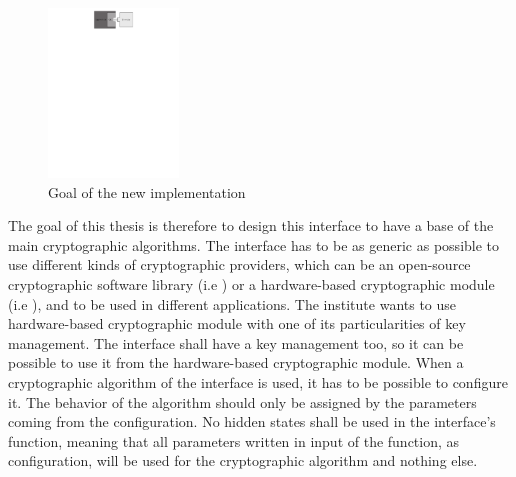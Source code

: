 \begin{figure}[!ht]
\centering
\includegraphics[trim=4.5cm 24.5cm 2cm 0cm, height=4.5cm]{figures/intro_gci.pdf}
\caption{Goal of the new implementation}
\label{fig:motiv_gci}
\end{figure}

The goal of this thesis is therefore to design this interface to have a
base of the main cryptographic algorithms. The interface has to be as
generic as possible to use different kinds of cryptographic providers, which can
be an open-source cryptographic software library (i.e \tomcrypt
\cite{doc:tomcrypt}) or a hardware-based cryptographic module (i.e \vaultic
\cite{doc:vault}), and to be used in different applications.
The institute wants to use hardware-based cryptographic module with one of its
particularities of key management.
The interface shall have a key management too, so it can be possible to use it
from the hardware-based cryptographic module.
When a cryptographic algorithm of the interface is used, it has to be
possible to configure it. The behavior of the algorithm should only be assigned
by the parameters coming from the configuration. No hidden states shall be used
in the interface's function, meaning that all parameters
written in input of the function, as configuration, will be used for the
cryptographic algorithm and nothing else.

